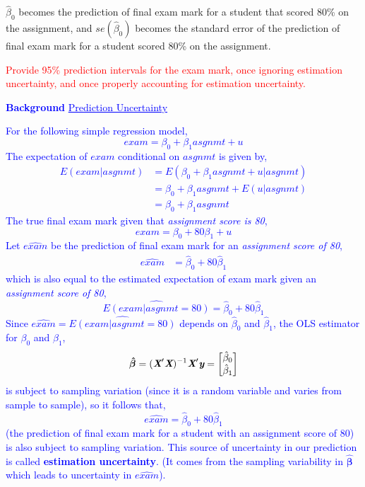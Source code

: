 \documentclass[12pt]{report}
\newenvironment{blueframed}[1][blue]
{\def\FrameCommand{\fboxsep=\FrameSep\fcolorbox{#1}{white}}%
	\MakeFramed {\advance\hsize-\width \FrameRestore}}
{\endMakeFramed}
\begin{document}
\justify \noindent $\hat{\beta}_0$ becomes the prediction of final exam mark for a student that scored 80\% on the assignment, and $se(\hat{\beta}_0)$ becomes the standard error of the prediction of final exam mark for a student scored 80\% on the assignment.

\noindent \textcolor{red}
{
	Provide 95\% prediction intervals for the exam mark, once ignoring estimation uncertainty, and once properly accounting for estimation uncertainty.
}

\justify
\begin{blueframed}
	\textcolor{blue}{\textbf{Background}}
	\vspace{-\baselineskip}
	\justify
	\textcolor{blue}{\underline{Prediction Uncertainty}}
	
	\noindent \textcolor{blue}
	{
		For the following simple regression model, $$exam = \beta_0 + \beta_1asgnmt + u$$
		The expectation of $exam$ conditional on $asgnmt$ is given by,
		\begin{align*}
		E(exam|asgnmt) &= E(\beta_0 + \beta_1asgnmt + u|asgnmt) \\
		&= \beta_0 + \beta_1asgnmt + E(u|asgnmt) \\ 
		&= \beta_0 + \beta_1asgnmt
		\end{align*}
		The true final exam mark given that \textit{assignment score is 80},
		$$exam = \beta_0 + 80\beta_1 + u$$
		Let $\widehat{exam}$ be the prediction of final exam mark for an \textit{assignment score of 80},
		\begin{align*}
		\widehat{exam} &= \hat{\beta}_0 + 80\hat{\beta}_1 
		\end{align*}
		which is also equal to the estimated expectation of exam mark given an \textit{assignment score of 80},
		$$\widehat{E(exam|asgnmt=80)} = \hat{\beta}_0 + 80\hat{\beta}_1$$
		Since $\widehat{exam} = \widehat{E(exam|asgnmt=80)}$ depends on $\hat{\beta}_0$ and $\hat{\beta}_1$, the OLS estimator for $\beta_0$ and $\beta_1$,
		$$\boldsymbol{\hat{\beta}} = (\textit{\textbf{X}}'\textit{\textbf{X}})^{-1}\textit{\textbf{X}}'\textit{\textbf{y}} 
		= 
		\begin{bmatrix}
		\hat{\beta}_0 \\
		\hat{\beta}_1 
		\end{bmatrix} $$
		is subject to sampling variation (since it is a random variable and varies from sample to sample), so it follows that, $$\widehat{exam} = \hat{\beta}_0 + 80\hat{\beta}_1$$ (the prediction of final exam mark for a student with an assignment score of 80) is also subject to sampling variation. This source of uncertainty in our prediction is called \textbf{estimation uncertainty}. (It comes from the sampling variability in $\boldsymbol{\hat{\beta}}$ which leads to uncertainty in $\widehat{exam}$).
	}
\end{blueframed}
\end{document}
